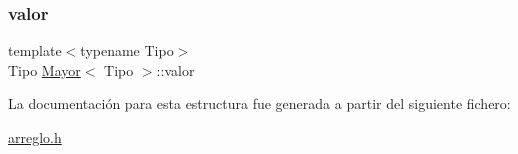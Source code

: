 \mbox{\label{struct_mayor_a7a5ca10e707addde5120f3b911ad2a61}} 
\subsubsection{\texorpdfstring{valor}{valor}}
{\footnotesize\ttfamily template$<$typename Tipo$>$ \\
Tipo \hyperlink{struct_mayor}{Mayor}$<$ Tipo $>$\+::valor}



La documentación para esta estructura fue generada a partir del siguiente fichero\+:\begin{DoxyCompactItemize}
\item 
\hyperlink{arreglo_8h}{arreglo.\+h}\end{DoxyCompactItemize}
